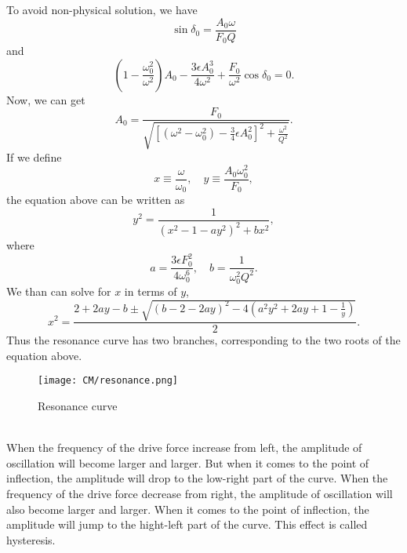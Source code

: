 To avoid non-physical solution, we have
\[\sin\delta_0 = \frac{A_0 \omega}{F_0 Q} \]
and
\[\left ( 1 - \frac{\omega_0^2}{\omega^2}\right ) A_0 - \frac{3\epsilon A_0^3}{4\omega^2} + \frac{F_0}{\omega^2}\cos\delta_0 = 0.\]
Now, we can get
\[A_0 = \frac{F_0}{\sqrt{\left[ (\omega^2 -\omega_0^2) - \frac{3}{4}\epsilon A_0^2 \right ]^2 + \frac{\omega^2}{Q^2} }}.\]
If we define
\[x \equiv \frac{\omega}{\omega_0} ,\quad y \equiv \frac{A_0 \omega_0^2}{F_0},\]
the equation above can be written as
\[y^2 = \frac{1}{(x^2-1-ay^2)^2 + bx^2}, \]
where
\[a = \frac{3\epsilon F_0^2}{4\omega_0^6}, \quad b = \frac{1}{\omega_0^2 Q^2}.\]
We than can solve for $x$ in terms of $y$,
\[x^2 = \frac{2 + 2ay-b \pm \sqrt{(b-2-2ay)^2-4(a^2y^2+2ay+1-\frac{1}{y})}}{2}.\]
Thus the resonance curve has two branches, corresponding to the two roots of the equation above.
\begin{figure}[!h]
	\centering
	\texttt{[image: CM/resonance.png]}
	\caption{Resonance curve}
\end{figure}
\\ 
When the frequency of the drive force increase from left, the amplitude of oscillation will become larger and larger. But when it comes to the point of inflection, the amplitude will drop to the low-right part of the curve. 
When the frequency of the drive force decrease from right, the amplitude of oscillation will also become larger and larger. When it comes to the point of inflection, the amplitude will jump to the hight-left part of the curve. 
This effect is called hysteresis.

